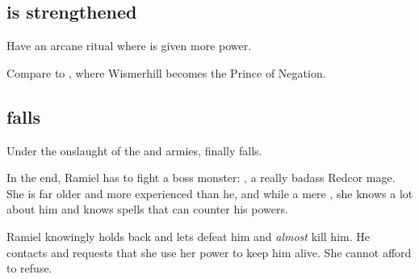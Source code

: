 






\subsection{\Vizsherioch{} is strengthened}
Have an arcane ritual where \Vizsherioch{} is given more power. 

Compare to , where Wismerhill becomes the Prince of Negation. 








\subsection{\Redce{} falls}
Under the onslaught of the  and  armies,  finally falls. 

In the end, Ramiel has to fight a boss monster: 
\Matriarch{} , a really badass Redcor mage. 
She is far older and more experienced than he, and while a mere \human, she knows a lot about him and knows spells that can counter his \resphan{} powers. 

Ramiel knowingly holds back and lets \Dominice{} defeat him and \emph{almost} kill him. 
He contacts \Belzir{} and requests that she use her power to keep him alive. 
She cannot afford to refuse. 

